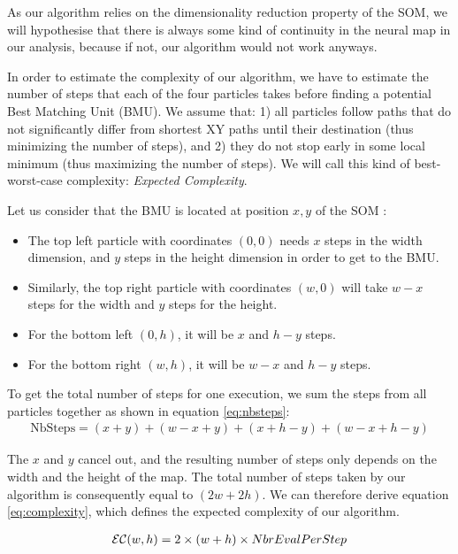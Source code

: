 As our algorithm relies on the dimensionality reduction property of the SOM, we will hypothesise that there is always some kind of continuity in the neural map in our analysis, because if not, our algorithm would not work anyways.

	In order to estimate the complexity of our algorithm, we have to estimate the number of steps that each of the four particles takes before finding a potential Best Matching Unit (BMU). We assume that: 1) all particles follow paths that do not significantly differ from shortest XY paths until their destination (thus minimizing the number of steps), and 2) they do not stop early in some local minimum (thus maximizing the number of steps). We will call this kind of  best-worst-case complexity: \textit{Expected Complexity}.

	Let us consider that the BMU is located at position $x, y$ of the SOM : 
	\begin{itemize}
    	\item The top left particle with coordinates $(0,0)$ needs $x$ steps in the width dimension, and $y$ steps in the height dimension in order to get to the BMU.
    	\item Similarly, the top right particle with coordinates $(w,0)$ will take $w-x$ steps for the width and $y$ steps for the height.
    	\item For the bottom left $(0,h)$, it will be $x$ and $h-y$ steps.
    	\item For the bottom right $(w,h)$, it will be $w-x$ and $h-y$ steps.
	\end{itemize}

	To get the total number of steps for one execution, we sum the steps from all particles together as shown in equation \ref{eq:nbsteps}:
	\begin{align}\label{eq:nbsteps}
    	\text{NbSteps} = (x + y) + (w - x + y) + (x + h - y) + (w - x + h - y) 
	\end{align}

	The $x$ and $y$ cancel out, and the resulting number of steps only depends on the width and the height of the map. The total number of steps taken by our algorithm is consequently equal to $(2w + 2h)$. 
	We can therefore derive equation \ref{eq:complexity}, which defines the expected complexity of our algorithm.

	\begin{align}\label{eq:complexity}
    	{\cal EC}(w, h) = 2 \times (w + h) \times NbrEvalPerStep
	\end{align}

